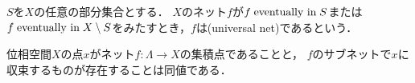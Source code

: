 \documentclass{ltjsbook}
\begin{document}
\begin{thmbox}
\begin{definition}
\(S\)を\(X\)の任意の部分集合とする．
\(X\)のネット\(f\)が\(f \mathrel{\text{eventually in}} S\)または\(f \mathrel{\text{eventually in}} X \setminus S\)をみたすとき，\(f\)は(universal net)であるという．
\end{definition}
\end{thmbox}

\begin{thmbox}
\begin{theorem}
位相空間\(X\)の点\(x\)がネット\(f\colon \Lambda \to X\)の集積点であることと，
\(f\)のサブネットで\(x\)に収束するものが存在することは同値である．
\end{theorem}
\end{thmbox}
\end{document}
